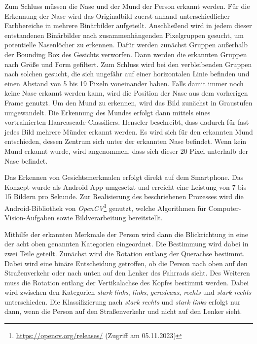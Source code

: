 Zum Schluss müssen die Nase und der Mund der Person erkannt werden. Für die Erkennung der Nase wird das Originalbild zuerst anhand unterschiedlicher Farbbereiche in mehrere Binärbilder aufgeteilt. Anschließend wird in jedem dieser entstandenen Binärbilder nach zusammenhängenden Pixelgruppen gesucht, um potentielle Nasenlöcher zu erkennen. Dafür werden zunächst Gruppen außerhalb der Bounding Box des Gesichts verworfen. Dann werden die erkannten Gruppen nach Größe und Form gefiltert. Zum Schluss wird bei den verbleibenden Gruppen nach solchen gesucht, die sich ungefähr auf einer horizontalen Linie befinden und einen Abstand von 5 bis 19 Pixeln voneinander haben. Falls damit immer noch keine Nase erkannt werden kann, wird die Position der Nase aus dem vorherigen Frame genutzt. 
Um den Mund zu erkennen, wird das Bild zunächst in Graustufen umgewandelt. Die Erkennung des Mundes erfolgt dann mittels eines vortrainierten Haarcascade-Classifiers. Henseler beschreibt, dass dadurch für fast jedes Bild mehrere Münder erkannt werden. Es wird sich für den erkannten Mund entschieden, dessen Zentrum sich unter der erkannten Nase befindet. Wenn kein Mund erkannt wurde, wird angenommen, dass sich dieser 20 Pixel unterhalb der Nase befindet.

Das Erkennen von Gesichtsmerkmalen erfolgt direkt auf dem Smartphone. Das Konzept wurde als Android-App umgesetzt und erreicht eine Leistung von 7 bis 15 Bildern pro Sekunde. Zur Realisierung des beschriebenen Prozesses wird die Android-Bibliothek von \textit{OpenCV}\footnote{\url{https://opencv.org/releases/} (Zugriff am 05.11.2023)} genutzt, welche Algorithmen für Computer-Vision-Aufgaben sowie Bildverarbeitung bereitstellt. 

Mithilfe der erkannten Merkmale der Person wird dann die Blickrichtung in eine der acht oben genannten Kategorien eingeordnet. Die Bestimmung wird dabei in zwei Teile geteilt. Zunächst wird die Rotation entlang der Querachse bestimmt. Dabei wird eine binäre Entscheidung getroffen, ob die Person nach oben auf den Straßenverkehr oder nach unten auf den Lenker des Fahrrads sieht. Des Weiteren muss die Rotation entlang der Vertikalachse des Kopfes bestimmt werden. Dabei wird zwischen den Kategorien \textit{stark links}, \textit{links}, \textit{geradeaus}, \textit{rechts} und \textit{stark rechts} unterschieden. Die Klassifizierung nach \textit{stark rechts} und \textit{stark links} erfolgt nur dann, wenn die Person auf den Straßenverkehr und nicht auf den Lenker sieht.

